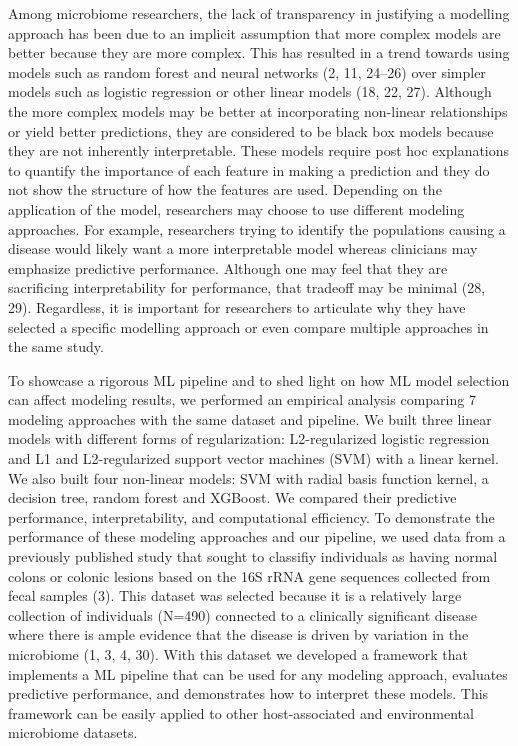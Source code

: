 \documentclass[11pt,]{article}
\begin{document}
Among microbiome researchers, the lack of transparency in justifying a
modelling approach has been due to an implicit assumption that more
complex models are better because they are more complex. This has
resulted in a trend towards using models such as random forest and
neural networks (2, 11, 24--26) over simpler models such as logistic
regression or other linear models (18, 22, 27). Although the more
complex models may be better at incorporating non-linear relationships
or yield better predictions, they are considered to be black box models
because they are not inherently interpretable. These models require post
hoc explanations to quantify the importance of each feature in making a
prediction and they do not show the structure of how the features are
used. Depending on the application of the model, researchers may choose
to use different modeling approaches. For example, researchers trying to
identify the populations causing a disease would likely want a more
interpretable model whereas clinicians may emphasize predictive
performance. Although one may feel that they are sacrificing
interpretability for performance, that tradeoff may be minimal (28, 29).
Regardless, it is important for researchers to articulate why they have
selected a specific modelling approach or even compare multiple
approaches in the same study.

To showcase a rigorous ML pipeline and to shed light on how ML model
selection can affect modeling results, we performed an empirical
analysis comparing 7 modeling approaches with the same dataset and
pipeline. We built three linear models with different forms of
regularization: L2-regularized logistic regression and L1 and
L2-regularized support vector machines (SVM) with a linear kernel. We
also built four non-linear models: SVM with radial basis function
kernel, a decision tree, random forest and XGBoost. We compared their
predictive performance, interpretability, and computational efficiency.
To demonstrate the performance of these modeling approaches and our
pipeline, we used data from a previously published study that sought to
classifiy individuals as having normal colons or colonic lesions based
on the 16S rRNA gene sequences collected from fecal samples (3). This
dataset was selected because it is a relatively large collection of
individuals (N=490) connected to a clinically significant disease where
there is ample evidence that the disease is driven by variation in the
microbiome (1, 3, 4, 30). With this dataset we developed a framework
that implements a ML pipeline that can be used for any modeling
approach, evaluates predictive performance, and demonstrates how to
interpret these models. This framework can be easily applied to other
host-associated and environmental microbiome datasets.
\end{document}
